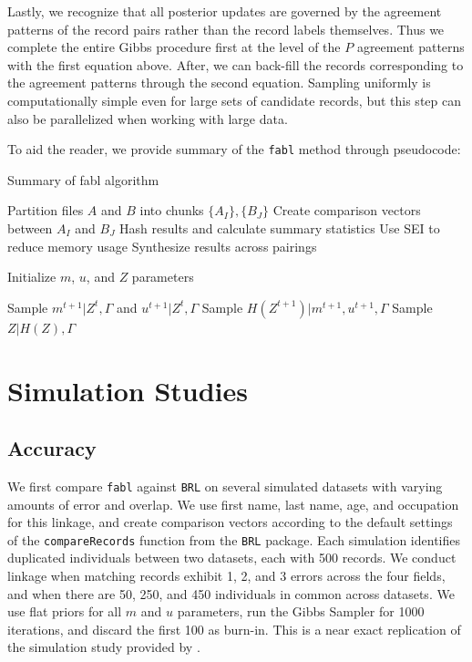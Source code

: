 \documentclass[12pt,letterpaper]{article}
\newcommand{\1}[1]{\mathbb{I}\!\left[#1\right]} %
\begin{document}
Lastly, we recognize that all posterior updates are governed by the
agreement patterns of the record pairs rather than the record labels
themselves. Thus we complete the entire Gibbs procedure first at the
level of the \(P\) agreement patterns with the first equation above.
After, we can back-fill the records corresponding to the agreement
patterns through the second equation. Sampling uniformly is
computationally simple even for large sets of candidate records, but this
step can also be parallelized when working with large data.

To aid the reader, we provide summary of the \texttt{fabl} method through pseudocode:

\begin{algorithm}
	\caption{Summary of fabl algorithm}
	\begin{algorithmic}[1]
		
		\State Partition files $A$ and $B$ into chunks $\{A_I\}, \{B_J\}$
		\State Create comparison vectors between $A_I$ and $B_J$
		\State Hash results and calculate summary statistics
		\State Use SEI to reduce memory usage
		\EndFor
		\State Synthesize results across pairings
		\EndProcedure
		
		\State Initialize $m$, $u$, and $Z$ parameters
		
		\State Sample $m^{t+1}|Z^{t}, \Gamma$ and  $u^{t+1}|Z^{t}, \Gamma$ 
		\State Sample $H\left(Z^{t+1}\right)|m^{t+1}, u^{t+1}, \Gamma$  
		\EndFor
		\State Sample $Z | H(Z), \Gamma$ 

		\EndProcedure
		
	\end{algorithmic}
\end{algorithm}

\section{Simulation Studies}
\label{sec:simulations}

\hypertarget{accuracy}{%
	\subsection{Accuracy}\label{accuracy}}

We first compare \texttt{fabl} against \texttt{BRL} on several simulated datasets with varying amounts of error and overlap. We use first name, last name, age, and occupation for this linkage, and create comparison vectors according to the default settings of the \texttt{compareRecords} function from the \texttt{BRL} package. Each simulation identifies duplicated individuals between two datasets, each with 500 records. We conduct linkage when matching records exhibit 1, 2, and 3 errors across the four fields, and when there are 50, 250, and 450 individuals in common across datasets. We use flat priors for all $m$ and $u$ parameters, run the Gibbs Sampler for 1000 iterations, and discard the first 100 as burn-in. This is a near exact replication of the simulation study provided by \citep{sadinle2017}. 
\end{document}
